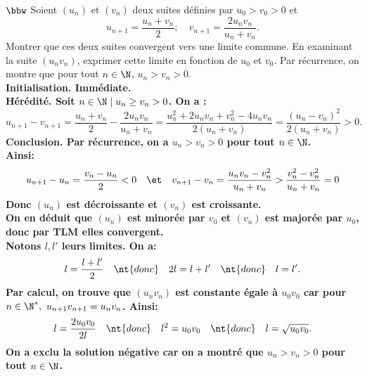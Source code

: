 \documentclass[11pt]{article}
\begin{document}
\begin{exercice}{$\bbw$}{}
    Soient $(u_n)$ et $(v_n)$ deux suites définies par $u_0>v_0>0$ et
    \begin{equation*}
        u_{n+1}=\frac{u_n+v_n}{2}; \quad v_{n+1}=\frac{2u_nv_n}{u_n+v_n}.
    \end{equation*}
    Montrer que ces deux suites convergent vers une limite commune. En examinant la suite $(u_nv_n)$, exprimer cette limite en fonction de $u_0$ et $v_0$.
    \tcblower
    Par récurrence, on montre que pour tout $n\in\N$, $u_n > v_n > 0$.\\
    \bf{Initialisation.} Immédiate.\\
    \bf{Hérédité.} Soit $n\in\N\mid u_n \geq v_n > 0$. On a :
    \begin{equation*}
        u_{n+1}-v_{n+1} = \frac{u_n + v_n}{2} - \frac{2u_nv_n}{u_n+v_n} = \frac{u_n^2 + 2u_nv_n + v_n^2 - 4u_nv_n}{2(u_n + v_n)}=\frac{(u_n-v_n)^2}{2(u_n + v_n)}>0.
    \end{equation*}
    \bf{Conclusion.} Par récurrence, on a $u_n > v_n > 0$ pour tout $n\in\N$.\\
    Ainsi:
    \begin{equation*}
        u_{n+1}-u_n=\frac{v_n - u_n}{2} < 0 \quad \et \quad v_{n+1} - v_n = \frac{u_nv_n - v_n^2}{u_n+v_n}>\frac{v_n^2-v_n^2}{u_n+v_n}=0
    \end{equation*}
    Donc $(u_n)$ est décroissante et $(v_n)$ est croissante.\\
    On en déduit que $(u_n)$ est minorée par $v_0$ et $(v_n)$ est majorée par $u_0$, donc par TLM elles convergent.\\
    Notons $l,l'$ leurs limites. On a:
    \begin{equation*}
        l = \frac{l + l'}{2} \quad \nt{donc} \quad 2l = l + l' \quad \nt{donc} \quad l = l'.
    \end{equation*}
    Par calcul, on trouve que $(u_nv_n)$ est constante égale à $u_0v_0$ car pour $n\in\N^*, ~ u_{n+1}v_{n+1}=u_nv_n$. Ainsi:
    \begin{equation*}
        l = \frac{2u_0v_0}{2l} \quad \nt{donc} \quad l^2 = u_0v_0 \quad \nt{donc} \quad l = \sqrt{u_0v_0}.
    \end{equation*}
    On a exclu la solution négative car on a montré que $u_n > v_n > 0$ pour tout $n\in\N$.
\end{exercice}

\pagebreak
\end{document}
